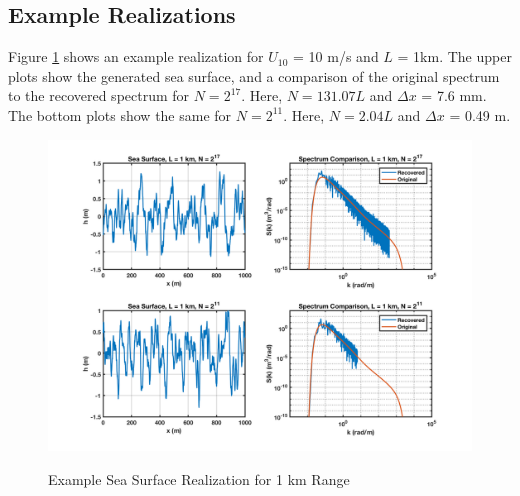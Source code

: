 \subsection{Example Realizations}
Figure \ref{os_fig:7a} shows an example realization for $U_{10}$ = 10 m/s and $L$ = 1km. The upper plots show the generated sea surface, and a comparison of the original spectrum to the recovered spectrum for $N = 2^{17}$. Here, $N = 131.07L$ and $\Delta x$ = 7.6 mm. The bottom plots show the same for $N=2^{11}$. Here, $N = 2.04L$ and $\Delta x$ = 0.49 m.
\begin{figure}[H]
  \begin{center}
\includegraphics[width=6in]{../media/Ocean_Surface/sea_surface_1000.png}
  \end{center}
  \renewcommand{\baselinestretch}{1} \small\normalsize
  \begin{quote}
    \caption[Example Sea Surface Realization for 1 km Range]{Example Sea Surface Realization for 1 km Range\label{os_fig:7a}}
  \end{quote}
\end{figure}
\renewcommand{\baselinestretch}{2} \small\normalsize

